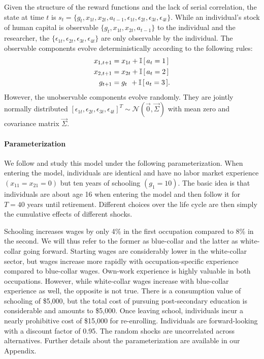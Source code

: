\noindent Given the structure of the reward functions and the lack of serial correlation, the state at time $t$ is $s_t = \{g_t,x_{1t},x_{2t},a_{t - 1},\epsilon_{1t},\epsilon_{2t},\epsilon_{3t},\epsilon_{4t}\}$.
%
While an individual's stock of human capital is observable $\{g_t,x_{1t},x_{2t},a_{t - 1}\}$ to the individual and the researcher, the $\{\epsilon_{1t},\epsilon_{2t},\epsilon_{3t},\epsilon_{4t}\}$ are only observable by the individual. The observable components evolve deterministically according to the following rules:
%
\begin{align*}
    x_{1,t+1}  &= x_{1t} + \mathbb{I}\,[\,a_t = 1\,] \\
x_{2,t+1} &= x_{2t} + \mathbb{I}\,[\,a_t = 2\,] \\
g_{t+1}   &= g_{t\phantom{2}}    +  \mathbb{I}\,[\,a_t = 3\,].
\end{align*}
%
However, the unobservable components evolve randomly. They are jointly normally distributed  $[\epsilon_{1t}, \epsilon_{2t}, \epsilon_{3t}, \epsilon_{4t}]^T \sim \mathcal{N}(\vec{0}, \vec{\Sigma})$ with mean zero and covariance matrix $\vec{\Sigma}$.

\paragraph{Parameterization} We follow \citet{Keane.1994} and study this model under the following parameterization. When entering the model, individuals are identical and have no labor market experience $(x_{11} = x_{21} = 0)$ but ten years of schooling $(g_1 = 10)$. The basic idea is that individuals are about age 16 when entering the model and then follow it for $T = 40$ years until retirement. Different choices over the life cycle are then simply the cumulative effects of different shocks.

Schooling increases wages by only 4\% in the first occupation compared to 8\% in the second. We will thus refer to the former as blue-collar and the latter as white-collar going forward. Starting wages are considerably lower in the white-collar sector, but wages increase more rapidly with occupation-specific experience compared to blue-collar wages. Own-work experience is highly valuable in both occupations. However, while white-collar wages increase with blue-collar experience as well, the opposite is not true. There is a consumption value of schooling of \$5,000, but the total cost of pursuing post-secondary education is considerable and amounts to \$5,000. Once leaving school, individuals incur a nearly prohibitive cost of \$15,000 for re-enrolling. Individuals are forward-looking with a discount factor of 0.95. The random shocks are uncorrelated across alternatives. Further details about the parameterization are available in our Appendix.

